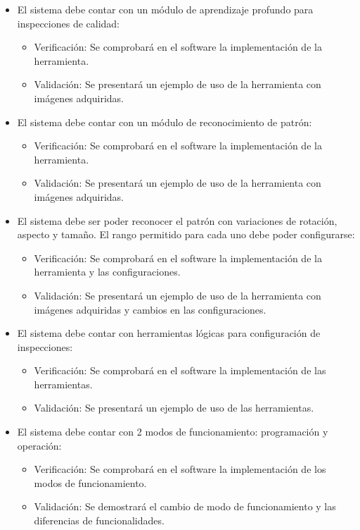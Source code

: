 \documentclass[
11pt, %
codirector, %
]{charter}
\begin{document}
\begin{itemize}
	\item \REQ El sistema debe contar con un módulo de aprendizaje profundo para inspecciones de calidad:
	\begin{itemize}
		\item Verificación: Se comprobará en el software la implementación de la herramienta.
		\item Validación: Se presentará un ejemplo de uso de la herramienta con imágenes adquiridas.
	\end{itemize}
	
	\item \REQ El sistema debe contar con un módulo de reconocimiento de patrón:
	\begin{itemize}
		\item Verificación: Se comprobará en el software la implementación de la herramienta.
		\item Validación: Se presentará un ejemplo de uso de la herramienta con imágenes adquiridas.
	\end{itemize}
	
	\item \REQ El sistema debe ser poder reconocer el patrón con variaciones de rotación, aspecto y tamaño. El rango permitido para cada uno debe poder configurarse:
	\begin{itemize}
		\item Verificación: Se comprobará en el software la implementación de la herramienta y las configuraciones.
		\item Validación: Se presentará un ejemplo de uso de la herramienta con imágenes adquiridas y cambios en las configuraciones.
	\end{itemize}
	
	\item \REQ El sistema debe contar con herramientas lógicas para configuración de inspecciones:
	\begin{itemize}
		\item Verificación: Se comprobará en el software la implementación de las herramientas.
		\item Validación: Se presentará un ejemplo de uso de las herramientas.
	\end{itemize}
	
	\item \REQ El sistema debe contar con 2 modos de funcionamiento: programación y operación:
	\begin{itemize}
		\item Verificación: Se comprobará en el software la implementación de los modos de funcionamiento.
		\item Validación: Se demostrará el cambio de modo de funcionamiento y las diferencias de funcionalidades.
	\end{itemize}
	

\end{itemize}
\end{document}
